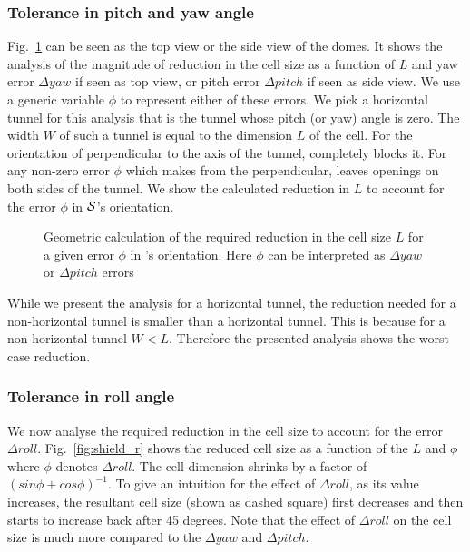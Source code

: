 \documentclass[a4paper]{report}
\begin{document}
\subsubsection{Tolerance in pitch and yaw angle}
Fig.~\ref{fig:shield_py} can be seen as the top view or the side view of the domes. It shows the analysis of the magnitude of reduction in the cell size as a function of $L$ and yaw error $\Delta yaw$ if seen as top view, or pitch error $\Delta pitch$ if seen as side view. We use a generic variable $\phi$ to represent either of these errors.
We pick a horizontal tunnel for this analysis that is the tunnel whose pitch (or yaw) angle is zero.
The width $W$ of such a tunnel is equal to the dimension $L$ of the cell. For the orientation of \calS perpendicular to the axis of the tunnel, \calS completely blocks it. For any non-zero error $\phi$ which \calS makes from the perpendicular, \calS leaves openings on both sides of the tunnel.
We show the calculated reduction in $L$ to account for the error $\phi$ in $\mathcal{S}$'s orientation.

\begin{figure}[ht]
\centering
\caption{Geometric calculation of the required reduction in the cell size $L$ for a given error $\phi$ in \calS's orientation. Here $\phi$ can be interpreted as $\Delta yaw$ or $\Delta pitch$ errors}
\label{fig:shield_py}
\end{figure}

While we present the analysis for a horizontal tunnel, the reduction needed for a non-horizontal tunnel is smaller than a horizontal tunnel. This is because for a non-horizontal tunnel $W < L$. Therefore the presented analysis shows the worst case reduction.


\subsubsection{Tolerance in roll angle}
We now analyse the required reduction in the cell size to account for the error $\Delta roll$. Fig.~\ref{fig:shield_r} shows the reduced cell size as a function of the $L$ and $\phi$ where $\phi$ denotes $\Delta roll$. The cell dimension shrinks by a factor of $(sin \phi + cos \phi)^{-1}$. To give an intuition for the effect of $\Delta roll$, as its value increases, the resultant cell size (shown as dashed square) first decreases and then starts to increase back after 45 degrees. Note that the effect of $\Delta roll$ on the cell size is much more compared to the $\Delta yaw$ and $\Delta pitch$.
\end{document}
